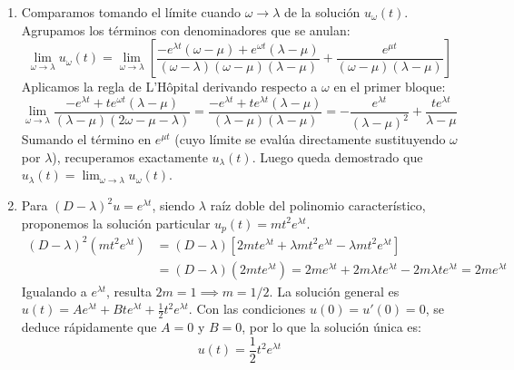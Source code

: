 {\begin{enumerate}
        \item[(c)] Comparamos tomando el límite cuando $\omega \to \lambda$ de la solución $u_\omega(t)$. Agrupamos los términos con denominadores que se anulan:
        \[
            \lim_{\omega \to \lambda} u_\omega(t) = \lim_{\omega \to \lambda} \left[ \frac{-e^{\lambda t}(\omega-\mu) + e^{\omega t}(\lambda-\mu)}{(\omega-\lambda)(\omega-\mu)(\lambda-\mu)} + \frac{e^{\mu t}}{(\omega-\mu)(\lambda-\mu)} \right]
        \]
        Aplicamos la regla de L'Hôpital derivando respecto a $\omega$ en el primer bloque:
        \[
            \lim_{\omega \to \lambda} \frac{-e^{\lambda t} + t e^{\omega t}(\lambda-\mu)}{(\lambda-\mu)(2\omega - \mu - \lambda)} = \frac{-e^{\lambda t} + t e^{\lambda t}(\lambda-\mu)}{(\lambda-\mu)(\lambda-\mu)} = -\frac{e^{\lambda t}}{(\lambda-\mu)^2} + \frac{t e^{\lambda t}}{\lambda-\mu}
        \]
        Sumando el término en $e^{\mu t}$ (cuyo límite se evalúa directamente sustituyendo $\omega$ por $\lambda$), recuperamos exactamente $u_\lambda(t)$. Luego queda demostrado que $u_\lambda(t) = \lim_{\omega \to \lambda} u_\omega(t)$.

        \item[(d)] Para $(D-\lambda)^2 u = e^{\lambda t}$, siendo $\lambda$ raíz doble del polinomio característico, proponemos la solución particular $u_p(t) = m t^2 e^{\lambda t}$.
        \begin{align*}
            (D-\lambda)^2 (m t^2 e^{\lambda t}) &= (D-\lambda) [2mt e^{\lambda t} + \lambda m t^2 e^{\lambda t} - \lambda m t^2 e^{\lambda t}] \\
            &= (D-\lambda)(2mt e^{\lambda t}) = 2m e^{\lambda t} + 2m\lambda t e^{\lambda t} - 2m\lambda t e^{\lambda t} = 2m e^{\lambda t}
        \end{align*}
        Igualando a $e^{\lambda t}$, resulta $2m = 1 \implies m = 1/2$.
        La solución general es $u(t) = A e^{\lambda t} + B t e^{\lambda t} + \frac{1}{2}t^2 e^{\lambda t}$.
        Con las condiciones $u(0)=u'(0)=0$, se deduce rápidamente que $A=0$ y $B=0$, por lo que la solución única es:
        \[
            u(t) = \frac{1}{2}t^2 e^{\lambda t}
        \]
    \end{enumerate}
}

